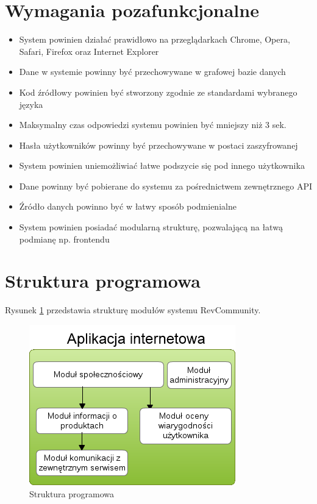 \section{Wymagania pozafunkcjonalne}
\begin{itemize}
\item System powinien działać prawidłowo na przeglądarkach Chrome, Opera, Safari, Firefox oraz Internet Explorer
\item Dane w systemie powinny być przechowywane w grafowej bazie danych
\item Kod źródłowy powinien być stworzony zgodnie ze standardami wybranego języka
\item Maksymalny czas odpowiedzi systemu powinien być mniejszy niż 3 sek.
\item Hasła użytkowników powinny być przechowywane w postaci zaszyfrowanej
\item System powinien uniemożliwiać łatwe podszycie się pod innego użytkownika 
\item Dane powinny być pobierane do systemu za pośrednictwem zewnętrznego API
\item Źródło danych powinno być w łatwy sposób podmienialne
\item System powinien posiadać modularną strukturę, pozwalającą na łatwą podmianę np. frontendu
\end{itemize}

\newpage

\section{Struktura programowa}

Rysunek \ref{fig:modules} przedstawia strukturę modułów systemu RevCommunity.

\begin{figure}[H]
	\centering
	\includegraphics[scale=0.9]{images/modules.png}
	\caption{Struktura programowa}
	\label{fig:modules}
\end{figure}

